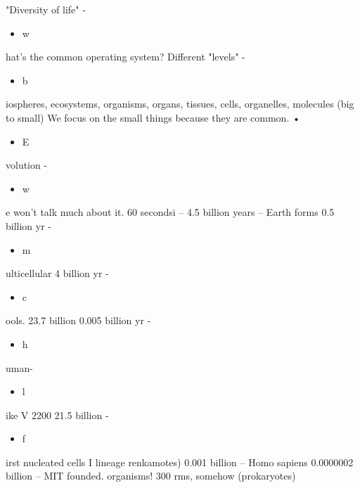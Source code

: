 "Diversity of life" -\begin{itemize}\item  w\end{itemize}hat's the common operating system?
Different "levels" -\begin{itemize}\item  b\end{itemize}iospheres, ecosystems, organisms, organs, tissues, cells,
organelles, molecules (big to small)
We focus on the small things because they are common.
•\begin{itemize}\item  E\end{itemize}volution -\begin{itemize}\item  w\end{itemize}e won't talk much about it. 60 secondsi
– 4.5 billion years – Earth forms
0.5 billion yr -\begin{itemize}\item  m\end{itemize}ulticellular
4 billion yr -\begin{itemize}\item  c\end{itemize}ools.
23.7 billion
0.005 billion yr -\begin{itemize}\item  h\end{itemize}uman-\begin{itemize}\item l\end{itemize}ike
V 2200 21.5 billion -\begin{itemize}\item  f\end{itemize}irst nucleated cells I
lineage
renkamotes)
0.001 billion – Homo sapiens
0.0000002 billion – MIT founded.
organisms!
300
rms, somehow
(prokaryotes)
